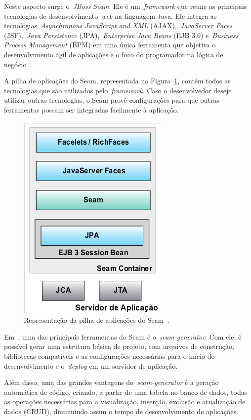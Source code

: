 Neste aspecto surge o~\emph{JBoss Seam}. Ele é um~\emph{framework} que reune as principais tecnologias de desenvolvimento~\emph{web} na linguagem Java. Ele integra as tecnologias~\emph{Asynchronous JavaScript and XML} (AJAX),~\emph{JavaServer Faces} (JSF),~\emph{Java Persistence} (JPA),~\emph{Enterprise Java Beans} (EJB 3.0) e~\emph{Business Process Management} (BPM) em uma única ferramenta que objetiva o desenvolvimento ágil de aplicações e o foco do programador na lógica de negócio~\cite{seamSite}.

A pilha de aplicações do Seam, representada na Figura~\ref{fig:servidor-app-seam}, contém todos as tecnologias que são utilizados pelo~\emph{framework}. Caso o desenvolvedor deseje utilizar outras tecnologias, o Seam provê configurações para que outras ferramentas possam ser integradas facilmente à aplicação.

\begin{figure}
	\centering
	\includegraphics[scale=0.65]{images/servidor-app-seam.png}
	\caption{Representação da pilha de aplicações do Seam~\cite{allen09}.}
	\label{fig:servidor-app-seam}
\end{figure}

Em~\cite{allen09}, uma das principais ferramentas do Seam é o~\emph{seam-generator}. Com ele, é possível gerar uma estrutura básica de projeto, com arquivos de construção, bibliotecas compatíveis e as configurações necessárias para o início do desenvolvimento e o~\emph{deploy} em um servidor de aplicação.

Além disso, uma das grandes vantagens do~\emph{seam-generator} é a geração automática de código, criando, a partir de uma tabela no banco de dados, todas as operações necessárias para a visualização, inserção, exclusão e atualização de dados (CRUD), diminuindo assim o tempo de desenvolvimento de aplicações.


